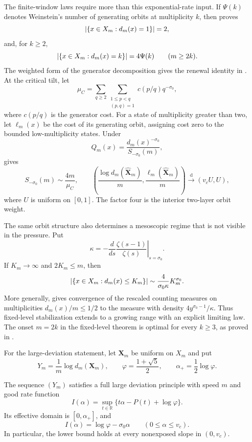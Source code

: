 The finite-window laws require more than this exponential-rate input.  If
\(\Psi(k)\) denotes Weinstein's number of generating orbits at multiplicity
\(k\), then  proves
\[
 \lvert \{x\in X_m:d_m(x)=1\} \rvert=2,
\]
and, for \(k\ge2\),
\[
 \lvert \{x\in X_m:d_m(x)=k\} \rvert=4\Psi(k)\qquad(m\ge2k).
\]
The weighted form of the generator decomposition gives the renewal identity
in .  At the critical tilt, let
\[
 \mu_C=\sum_{q\ge2}\sum_{\substack{1\le p<q\\(p,q)=1}}
 c(p/q)q^{-\sigma_0},
\]
where \(c(p/q)\) is the generator cost.  For a state of multiplicity greater
than two, let \(\ell_m(x)\) be the cost of its generating orbit, assigning
cost zero to the bounded low-multiplicity states.  Under
\[
 \widehat Q_m(x)=\frac{d_m(x)^{-\sigma_0}}{S_{-\sigma_0}(m)},
\]
 gives
\begin{equation}
 S_{-\sigma_0}(m)\sim\frac{4m}{\mu_C},
 \qquad
 \left(\frac{\log d_m(\widehat{\mathbf X}_m)}m,
       \frac{\ell_m(\widehat{\mathbf X}_m)}m\right)
 \xrightarrow{\mathrm d}(v_cU,U),
 \label{eq:introduction-critical-coexistence}
\end{equation}
where \(U\) is uniform on \([0,1]\).  The factor four is the interior
two-layer orbit weight.

The same orbit structure also determines a mesoscopic regime that is not
visible in the pressure.  Put
\[
 \kappa=-\left.\frac{d}{ds}\frac{\zeta(s-1)}{\zeta(s)}
 \right|_{s=\sigma_0}.
\]
If \(K_m\to\infty\) and \(2K_m\le m\), then
\begin{equation}
 \lvert \{x\in X_m:d_m(x)\le K_m\} \rvert
 \sim\frac4{\sigma_0\kappa}K_m^{\sigma_0}.
 \label{eq:introduction-mesoscopic-count}
\end{equation}
More generally,  gives convergence of
the rescaled counting measures on multiplicities \(d_m(x)/m\le1/2\) to
the measure with density \(4y^{\sigma_0-1}/\kappa\).  Thus fixed-level
stabilization extends to a growing range with an explicit limiting law.
The onset \(m=2k\) in the fixed-level theorem is optimal for every \(k\ge3\),
as proved in .

For the large-deviation statement, let \(\mathbf X_m\) be uniform on \(X_m\)
and put
\[
 Y_m=\frac1m\log d_m(\mathbf X_m),
 \qquad \varphi=\frac{1+\sqrt5}{2},
 \qquad \alpha_+=\frac12\log\varphi.
\]

\begin{theoremC}
The sequence \((Y_m)\) satisfies a full large deviation principle with
speed \(m\) and good rate function
\[
 I(\alpha)=\sup_{t\in\mathbb R}
 \{t\alpha-P(t)+\log\varphi\}.
\]
Its effective domain is \([0,\alpha_+]\), and
\[
 I(\alpha)=\log\varphi-\sigma_0\alpha
 \qquad(0\le\alpha\le v_c).
\]
In particular, the lower bound holds at every nonexposed slope in
\((0,v_c)\).
\end{theoremC}


